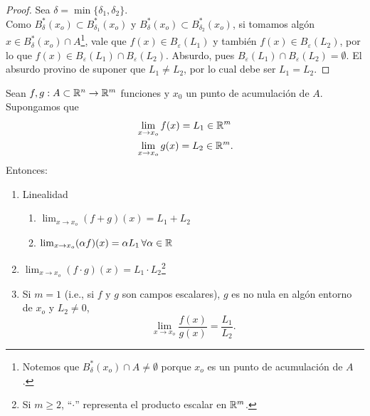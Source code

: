 \begin{theorem}
\begin{proof}
 Sea $\delta = \min\{ \delta_1, \delta_2 \}$. \\
 Como $B_{\delta}^*(x_o) \subset B_{\delta_1}^*(x_o)$ y $B_{\delta}^*(x_o) \subset B_{\delta_2}^*(x_o)$, si tomamos alg\'on $x \in B_{\delta}^*(x_o) \cap A$\footnote{Notemos que $B_{\delta}^*(x_o) \cap A \ne \emptyset$ porque $x_o$ es un punto de acumulaci\'on de $A$.}, vale que $f(x) \in B_{\varepsilon}(L_1)$ y tambi\'en $f(x) \in B_{\varepsilon}(L_2)$, por lo que $f(x) \in B_{\varepsilon}(L_1) \cap B_{\varepsilon}(L_2)$. Absurdo, pues $B_{\varepsilon}(L_1) \cap B_{\varepsilon}(L_2) = \emptyset$. El absurdo provino de suponer que $L_1 \ne L_2$, por lo cual debe ser $L_1 = L_2$.

\end{proof}

\end{theorem}
\begin{propertie} \label{prop:alg_lim} Sean $f,g:A \subset \mathbb{R}^n \to \mathbb{R}^m$ funciones y $x_0$ un punto de acumulaci\'on de $A$. Supongamos que 
  \begin{align*}
   &\lim_{x \to x_o} f(x) = L_1 \in \mathbb{R}^m \\
   &\lim_{x \to x_o} g(x) = L_2 \in \mathbb{R}^m.
  \end{align*}
  Entonces:
  \begin{enumerate} %
   \item Linealidad
      \begin{enumerate} %
       \item $\lim_{x \to x_o} (f + g)(x) = L_1 + L_2$
       \item $\lim_{x \to x_o} (\alpha f)(x) = \alpha L_1 \, \forall \alpha \in \mathbb{R}$
      \end{enumerate}
  \item $\lim_{x \to x_o} (f \cdot g) (x) = L_1 \cdot L_2$\footnote{Si $m \ge 2$, ``$\cdot$'' representa el producto escalar en $\mathbb{R}^m$.}
  \item Si $m = 1$ (i.e., si $f \text{ y } g$ son campos escalares), $g$ es no nula en alg\'on entorno de $x_o$ y $L_2 \ne 0$, 
  \[
   \lim_{x \to x_o} \frac{f(x)}{g(x)} = \frac{L_1}{L_2}.
  \]
  \end{enumerate}
\end{propertie}

